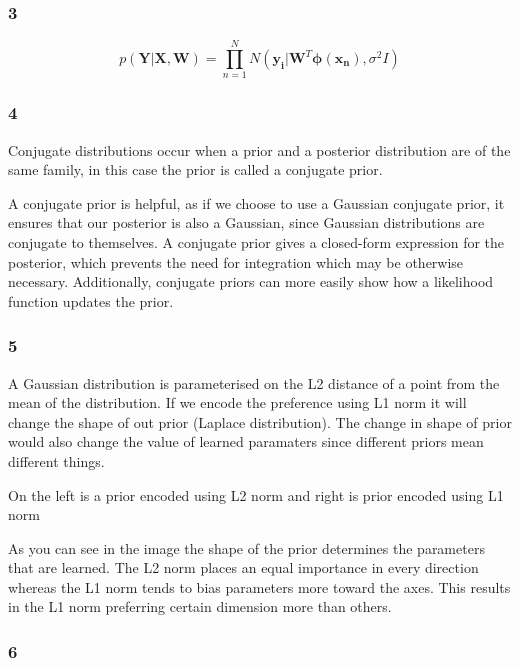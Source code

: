 \documentclass[11pt]{article}
\begin{document}
    \subsubsection*{3}\label{section}

\[
p(\mathbf{Y} | \mathbf{X}, \mathbf{W}) = \prod_{n=1}^{N} N(\boldsymbol{y_i} | \boldsymbol{W}^T\boldsymbol{\phi}(\boldsymbol{x_n}), \sigma^2 I)
\]

    \subsubsection*{4}\label{section}

Conjugate distributions occur when a prior and a posterior distribution
are of the same family, in this case the prior is called a conjugate
prior.

A conjugate prior is helpful, as if we choose to use a Gaussian
conjugate prior, it ensures that our posterior is also a Gaussian, since
Gaussian distributions are conjugate to themselves. A conjugate prior
gives a closed-form expression for the posterior, which prevents the
need for integration which may be otherwise necessary. Additionally,
conjugate priors can more easily show how a likelihood function updates
the prior.

    \subsubsection*{5}\label{section}

A Gaussian distribution is parameterised on the L2 distance of a point
from the mean of the distribution. If we encode the preference using L1
norm it will change the shape of out prior (Laplace distribution). The
change in shape of prior would also change the value of learned
paramaters since different priors mean different things.
\begin{center}
\end{center}
On the left is a
prior encoded using L2 norm and right is prior encoded using L1 norm

As you can see in the image the shape of the prior determines the
parameters that are learned. The L2 norm places an equal importance in
every direction whereas the L1 norm tends to bias parameters more toward
the axes. This results in the L1 norm preferring certain dimension more
than others.

    \subsubsection*{6}\label{section}
\end{document}
